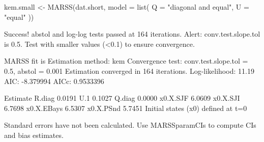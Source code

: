 \begin{Schunk}
\begin{Sinput}
 kem.small <- MARSS(dat.short, model = list(
   Q = "diagonal and equal",
   U = "equal"
 ))
\end{Sinput}
\begin{Soutput}
Success! abstol and log-log tests passed at 164 iterations.
Alert: conv.test.slope.tol is 0.5.
Test with smaller values (<0.1) to ensure convergence.

MARSS fit is
Estimation method: kem 
Convergence test: conv.test.slope.tol = 0.5, abstol = 0.001
Estimation converged in 164 iterations. 
Log-likelihood: 11.19 
AIC: -8.379994   AICc: 0.9533396   
 
           Estimate
R.diag       0.0191
U.1          0.1027
Q.diag       0.0000
x0.X.SJF     6.0609
x0.X.SJI     6.7698
x0.X.EBays   6.5307
x0.X.PSnd    5.7451
Initial states (x0) defined at t=0

Standard errors have not been calculated. 
Use MARSSparamCIs to compute CIs and bias estimates.
\end{Soutput}
\end{Schunk}

